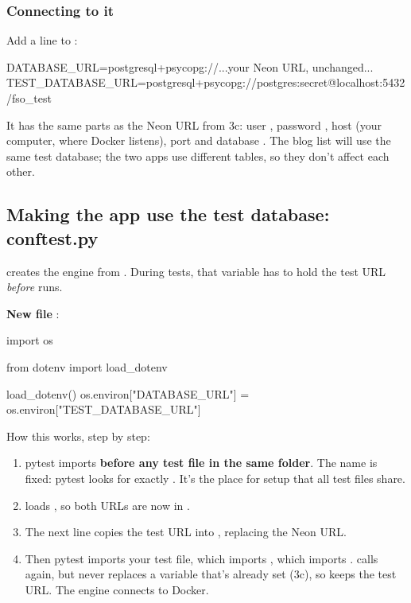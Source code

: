 \subsubsection{Connecting to it}

Add a line to :

\begin{code}
DATABASE_URL=postgresql+psycopg://...your Neon URL, unchanged...
TEST_DATABASE_URL=postgresql+psycopg://postgres:secret@localhost:5432/fso_test
\end{code}

It has the same parts as the Neon URL from 3c: user , password , host  (your computer, where Docker listens), port  and database . The blog list will use the same test database; the two apps use different tables, so they don't affect each other.

\subsection{Making the app use the test database: conftest.py}

 creates the engine from . During tests, that variable has to hold the test URL \emph{before}  runs.

\textbf{New file} :

\begin{py}
import os

from dotenv import load_dotenv

load_dotenv()
os.environ["DATABASE_URL"] = os.environ["TEST_DATABASE_URL"]
\end{py}

How this works, step by step:
\begin{enumerate}
\item pytest imports  \textbf{before any test file in the same folder}. The name is fixed: pytest looks for exactly . It's the place for setup that all test files share.
\item {} loads , so both URLs are now in .
\item The next line copies the test URL into , replacing the Neon URL.
\item Then pytest imports your test file, which imports , which imports .  calls  again, but  never replaces a variable that's already set (3c), so  keeps the test URL. The engine connects to Docker.
\end{enumerate}

